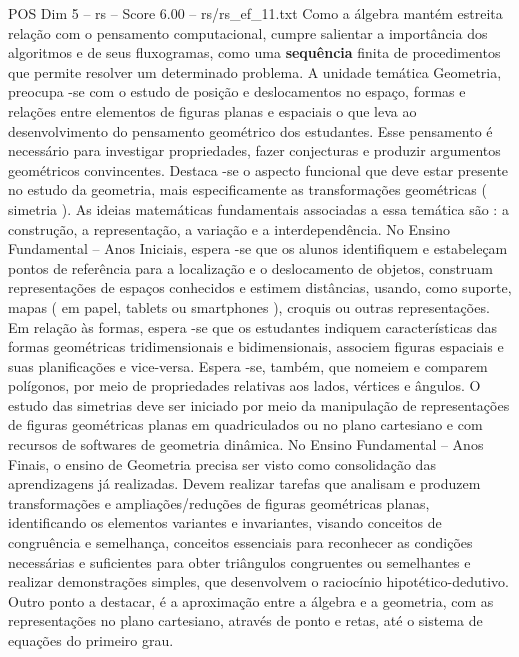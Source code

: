 \begin{textsample}{POS Dim 5 – rs – Score 6.00 – rs/rs\_ef\_11.txt}
Como a álgebra mantém estreita relação com o pensamento computacional, cumpre salientar a importância dos algoritmos e de seus fluxogramas, como uma \textbf{sequência} finita de procedimentos que permite resolver um determinado problema.
A unidade temática Geometria, preocupa -se com o estudo de posição e deslocamentos no espaço, formas e relações entre elementos de figuras planas e espaciais o que leva ao desenvolvimento do pensamento geométrico dos estudantes.
Esse pensamento é necessário para investigar propriedades, fazer conjecturas e produzir argumentos geométricos convincentes.
Destaca -se o aspecto funcional que deve estar presente no estudo da geometria, mais especificamente as transformações geométricas ( simetria ).
As ideias matemáticas fundamentais associadas a essa temática são : a construção, a representação, a variação e a interdependência.
No Ensino Fundamental – Anos Iniciais, espera -se que os alunos identifiquem e estabeleçam pontos de referência para a localização e o deslocamento de objetos, construam representações de espaços conhecidos e estimem distâncias, usando, como suporte, mapas ( em papel, tablets ou smartphones ), croquis ou outras representações.
Em relação às formas, espera -se que os estudantes indiquem características das formas geométricas tridimensionais e bidimensionais, associem figuras espaciais e suas planificações e vice-versa.
Espera -se, também, que nomeiem e comparem polígonos, por meio de propriedades relativas aos lados, vértices e ângulos.
O estudo das simetrias deve ser iniciado por meio da manipulação de representações de figuras geométricas planas em quadriculados ou no plano cartesiano e com recursos de softwares de geometria dinâmica.
No Ensino Fundamental – Anos Finais, o ensino de Geometria precisa ser visto como consolidação das aprendizagens já realizadas.
Devem realizar tarefas que analisam e produzem transformações e ampliações/reduções de figuras geométricas planas, identificando os elementos variantes e invariantes, visando conceitos de congruência e semelhança, conceitos essenciais para reconhecer as condições necessárias e suficientes para obter triângulos congruentes ou semelhantes e realizar demonstrações simples, que desenvolvem o raciocínio hipotético-dedutivo.
Outro ponto a destacar, é a aproximação entre a álgebra e a geometria, com as representações no plano cartesiano, através de ponto e retas, até o sistema de equações do primeiro grau.

\end{textsample}
